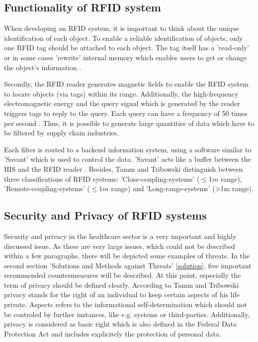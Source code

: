 \subsection{Functionality of RFID system}

When developing an RFID system, it is important to think about the unique identification of each object. To enable a reliable identification of objects, only one RFID tag should be attached to each object. The tag itself has a 'read-only' or in some cases 'rewrite' internal memory which enables users to get or change the object's information \cite{ncbi}. 

Secondly, the RFID reader generates magnetic fields to enable the RFID system to locate objects (via tags) within its range. Additionally, the high-frequency electromagnetic energy and the query signal which is generated by the reader triggers tags to reply to the query. Each query can have a frequency of 50 times per second \cite{ncbi}. Thus, it is possible to generate large quantities of data which have to be filtered by supply chain industries. 

Each filter is routed to a backend information system, using a software similar to 'Savant' which is used to control the data. 'Savant' acts like a buffer between the HIS and the RFID reader \cite{ncbi}.
Besides, Tamm and Tribowski \cite[p.18 ff.]{fokus} distinguish between three classifications of RFID systems: 'Close-coupling-systems' ($\le1m$ range), 'Remote-coupling-systems' ($\le1m$ range) and 'Long-range-systems' (>1m range). 

\subsection{Security and Privacy of RFID systems} \label{secprivrfid}

Security and privacy in the healthcare sector is a very important and highly discussed issue. As these are very large issues, which could not be described within a few paragraphs, there will be depicted some examples of threats. In the second section 'Solutions and Methods against Threats' \ref{solution}, five important recommended countermeasures will be described. 
At this point, especially the term of privacy should be defined clearly. According to Tamm and Tribowski \cite[p.90 ff.]{fokus} privacy stands for the right of an individual to keep certain aspects of his life private. Aspects refers to the informational self-determination which should not be controled by further instances, like e.g. systems or third-parties. Additionally, privacy is considered as basic right which is also defined in the Federal Data Protection Act and includes explicitely the protection of personal data.

